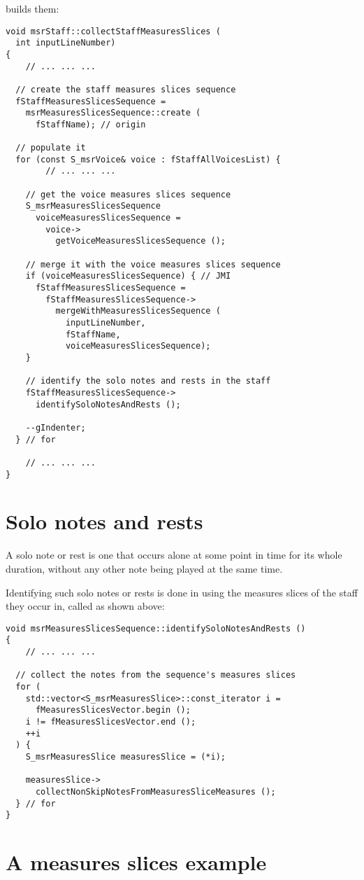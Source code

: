  builds them:
\begin{lstlisting}[language=CPlusPlus]
void msrStaff::collectStaffMeasuresSlices (
  int inputLineNumber)
{
	// ... ... ...

  // create the staff measures slices sequence
  fStaffMeasuresSlicesSequence =
    msrMeasuresSlicesSequence::create (
      fStaffName); // origin

  // populate it
  for (const S_msrVoice& voice : fStaffAllVoicesList) {
		// ... ... ...

    // get the voice measures slices sequence
    S_msrMeasuresSlicesSequence
      voiceMeasuresSlicesSequence =
        voice->
          getVoiceMeasuresSlicesSequence ();

    // merge it with the voice measures slices sequence
    if (voiceMeasuresSlicesSequence) { // JMI
      fStaffMeasuresSlicesSequence =
        fStaffMeasuresSlicesSequence->
          mergeWithMeasuresSlicesSequence (
            inputLineNumber,
            fStaffName,
            voiceMeasuresSlicesSequence);
    }

    // identify the solo notes and rests in the staff
    fStaffMeasuresSlicesSequence->
      identifySoloNotesAndRests ();

    --gIndenter;
  } // for

	// ... ... ...
}
\end{lstlisting}


\section{Solo notes and rests}

A solo note or rest is one that occurs alone at some point in time for its whole duration, without any other note being played at the same time.

Identifying such solo notes or rests is done in  using the measures slices of the staff they occur in, called  as shown above:
\begin{lstlisting}[language=CPlusPlus]
void msrMeasuresSlicesSequence::identifySoloNotesAndRests ()
{
	// ... ... ...

  // collect the notes from the sequence's measures slices
  for (
    std::vector<S_msrMeasuresSlice>::const_iterator i =
      fMeasuresSlicesVector.begin ();
    i != fMeasuresSlicesVector.end ();
    ++i
  ) {
    S_msrMeasuresSlice measuresSlice = (*i);

    measuresSlice->
      collectNonSkipNotesFromMeasuresSliceMeasures ();
  } // for
}
\end{lstlisting}


\section{A measures slices example}


